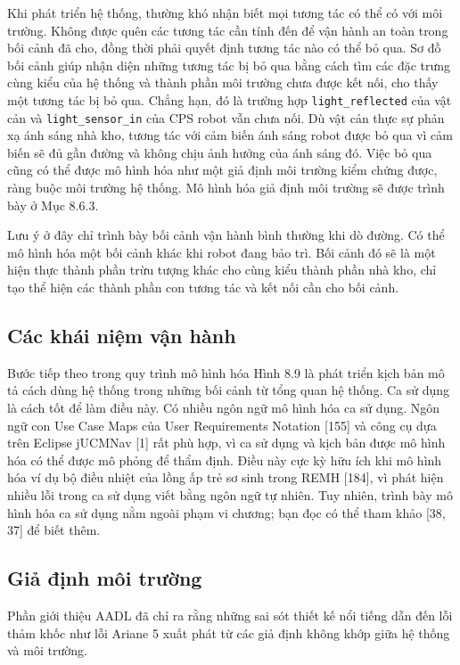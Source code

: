 Khi phát triển hệ thống, thường khó nhận biết mọi tương tác có thể có với môi trường. Không được quên các tương tác cần tính đến để vận hành an toàn trong bối cảnh đã cho, đồng thời phải quyết định tương tác nào có thể bỏ qua. Sơ đồ bối cảnh giúp nhận diện những tương tác bị bỏ qua bằng cách tìm các đặc trưng cùng kiểu của hệ thống và thành phần môi trường chưa được kết nối, cho thấy một tương tác bị bỏ qua. Chẳng hạn, đó là trường hợp \texttt{light\_reflected} của vật cản và \texttt{light\_sensor\_in} của CPS robot vẫn chưa nối. Dù vật cản thực sự phản xạ ánh sáng nhà kho, tương tác với cảm biến ánh sáng robot được bỏ qua vì cảm biến sẽ đủ gần đường và không chịu ảnh hưởng của ánh sáng đó. Việc bỏ qua cũng có thể được mô hình hóa như một giả định môi trường kiểm chứng được, ràng buộc môi trường hệ thống. Mô hình hóa giả định môi trường sẽ được trình bày ở Mục 8.6.3.

Lưu ý ở đây chỉ trình bày bối cảnh vận hành bình thường khi dò đường. Có thể mô hình hóa một bối cảnh khác khi robot đang bảo trì. Bối cảnh đó sẽ là một hiện thực thành phần trừu tượng khác cho cùng kiểu thành phần nhà kho, chỉ tạo thể hiện các thành phần con tương tác và kết nối cần cho bối cảnh.

\subsection{Các khái niệm vận hành}
Bước tiếp theo trong quy trình mô hình hóa Hình 8.9 là phát triển kịch bản mô tả cách dùng hệ thống trong những bối cảnh từ tổng quan hệ thống. Ca sử dụng là cách tốt để làm điều này. Có nhiều ngôn ngữ mô hình hóa ca sử dụng. Ngôn ngữ con Use Case Maps của User Requirements Notation [155] và công cụ dựa trên Eclipse jUCMNav [1] rất phù hợp, vì ca sử dụng và kịch bản được mô hình hóa có thể được mô phỏng để thẩm định. Điều này cực kỳ hữu ích khi mô hình hóa ví dụ bộ điều nhiệt của lồng ấp trẻ sơ sinh trong REMH [184], vì phát hiện nhiều lỗi trong ca sử dụng viết bằng ngôn ngữ tự nhiên. Tuy nhiên, trình bày mô hình hóa ca sử dụng nằm ngoài phạm vi chương; bạn đọc có thể tham khảo [38, 37] để biết thêm.

\subsection{Giả định môi trường}
Phần giới thiệu AADL đã chỉ ra rằng những sai sót thiết kế nổi tiếng dẫn đến lỗi thảm khốc như lỗi Ariane 5 xuất phát từ các giả định không khớp giữa hệ thống và môi trường.

